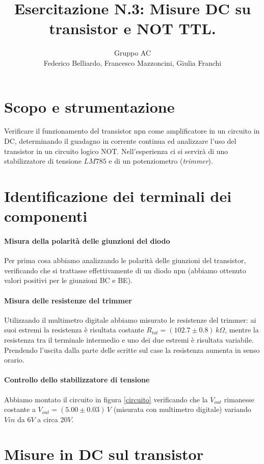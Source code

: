 \documentclass[10pt,a4paper]{article}
\author{Gruppo AC \\ Federico Belliardo, Francesco Mazzoncini, Giulia Franchi}
\title{Esercitazione N.3: Misure DC su transistor e NOT TTL.}
\begin{document}
\maketitle
\section{Scopo e strumentazione}
Verificare il funzionamento del transistor npn come amplificatore in un circuito in DC, determinando il guadagno in corrente continua ed analizzare l'uso del transistor in un circuito logico NOT. Nell'esperienza ci si servirà di uno stabilizzatore di tensione $LM785$ e di un potenziometro (\textit{trimmer}).

\section{Identificazione dei terminali dei componenti}

\paragraph{Misura della polarità delle giunzioni del diodo}
Per prima cosa abbiamo analizzando le polarità delle giunzioni del transistor, verificando che si trattasse effettivamente  di un diodo npn (abbiamo ottenuto valori positivi per le giunzioni BC e BE).

\paragraph{Misura delle resistenze del trimmer}

Utilizzando il multimetro digitale abbiamo misurato le resistenze del trimmer: ai suoi estremi la resistenza è risultata costante $R_{tot}= (102.7 \pm 0.8)\, k\Omega$, mentre la resistenza tra il terminale intermedio e uno dei due estremi è risultata variabile. Prendendo l'uscita dalla parte delle scritte sul case la resistenza aumenta in senso orario.

\paragraph{Controllo dello stabilizzatore di tensione}
Abbiamo montato il circuito in  figura \ref{circuito} verificando che  la $V_{out}$ rimanesse costante a $V_{out} = (5.00 \pm 0.03) \, V$ (misurata con multimetro digitale) variando $V{in}$ da $6V$ a circa $20V$. 

\section{Misure in DC sul transistor}
\end{document}
